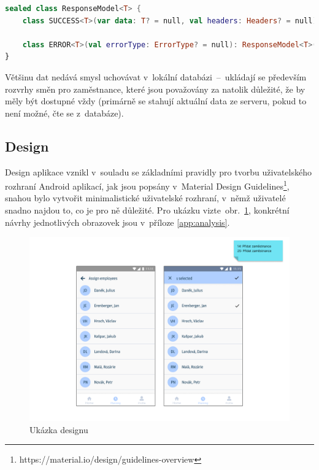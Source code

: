 \documentclass[a4paper,11pt,openany,twoside]{book}
\begin{document}
\begin{lstlisting}[language=Kotlin,caption={Třída \texttt{ResponseModel}},label={lst:responsemodel}]
sealed class ResponseModel<T> {
	class SUCCESS<T>(var data: T? = null, val headers: Headers? = null): ResponseModel<T>()

	class ERROR<T>(val errorType: ErrorType? = null): ResponseModel<T>()
}
\end{lstlisting}

Většinu dat nedává smysl uchovávat v~lokální databázi~–~ukládají se především rozvrhy směn pro zaměstnance, které jsou považovány za natolik důležité, že by měly být dostupné vždy (primárně se stahují aktuální data ze serveru, pokud to není možné, čte se z~databáze).

\subsection{Design}\label{design}

Design aplikace vznikl v~souladu se základními pravidly pro tvorbu uživatelského rozhraní Android aplikací, jak jsou popsány v~Material Design Guidelines\footnote{https://material.io/design/guidelines-overview}, snahou bylo vytvořit minimalistické uživatelské rozhraní, v~němž uživatelé snadno najdou to, co je pro ně důležité. Pro ukázku vizte~obr.~\ref{fig:design}, konkrétní návrhy jednotlivých obrazovek jsou v~příloze \ref{app:analysis}.

\begin{figure}[h]
	\centering
	\includegraphics[width=\textwidth]{img/design.png}
	\caption{Ukázka designu}
	\label{fig:design}
\end{figure}
\end{document}
